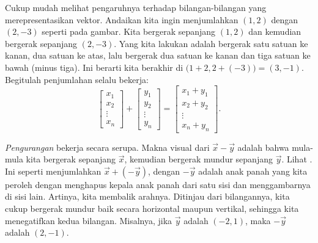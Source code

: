 Cukup mudah melihat pengaruhnya terhadap bilangan-bilangan yang merepresentasikan
vektor. Andaikan kita ingin menjumlahkan $(1,2)$ dengan $(2,-3)$ seperti pada gambar.
Kita bergerak sepanjang $(1,2)$
dan kemudian bergerak sepanjang $(2,-3)$.
Yang kita lakukan adalah bergerak satu satuan ke kanan, dua satuan ke atas, lalu
bergerak dua satuan ke kanan dan tiga satuan ke bawah (minus tiga). Ini
berarti kita berakhir di $\bigl(1+2,2+(-3)\bigr) = (3,-1)$.
Begitulah penjumlahan selalu bekerja:
\begin{equation*}
\begin{bmatrix}
x_{1} \\ x_2 \\ \vdots \\ x_n
\end{bmatrix} +
\begin{bmatrix}
y_{1} \\ y_2 \\ \vdots \\ y_n
\end{bmatrix} =
\begin{bmatrix}
x_1 + y_{1} \\ x_2+ y_2 \\ \vdots \\ x_n + y_n
\end{bmatrix} .
\end{equation*}

\emph{Pengurangan} bekerja secara serupa.
Makna visual dari $\vec{x}- \vec{y}$ adalah bahwa
mula-mula kita bergerak sepanjang $\vec{x}$, kemudian bergerak
mundur sepanjang $\vec{y}$.
Lihat .
Ini seperti menjumlahkan
$\vec{x}+ (- \vec{y})$, dengan $-\vec{y}$
adalah anak panah yang kita peroleh dengan menghapus kepala anak panah
dari satu sisi dan menggambarnya di sisi lain.
Artinya, kita membalik
arahnya. Ditinjau dari bilangannya, kita cukup bergerak mundur baik
secara horizontal maupun vertikal,
sehingga kita menegatifkan kedua bilangan. Misalnya, jika $\vec{y}$ adalah $(-2,1)$,
maka $-\vec{y}$ adalah $(2,-1)$.

\begin{myfig}
\capstart
{}
\caption{Pengurangan: vektor $(1,2)$, yang digambar bertitik-titik, dikurangi $(-2,1)$,
yang digambar putus-putus. Hasilnya,
$(3,1)$, digambar sebagai anak panah utuh.\label{linalg-vecsub:fig}}
\end{myfig}

